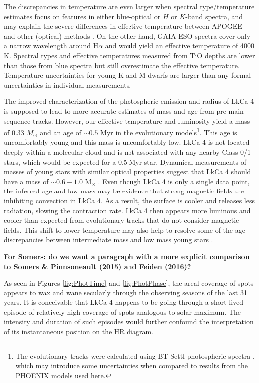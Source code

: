 \documentclass[twocolumn]{emulateapj}%
\begin{document}
The discrepancies in temperature are even larger when spectral type/temperature estimates focus on features in either blue-optical or $H$ or $K$-band spectra, and may explain the severe differences in effective temperature between APOGEE and other (optical) methods \citep{cottaar14}.  On the other hand, GAIA-ESO spectra \citep{frasca15} cover only a narrow wavelength around H$\alpha$ and would yield an effective temperature of 4000 K.   Spectral types and effective temperatures measured from TiO depths \citep{herczeg14} are lower than those from blue spectra but still overestimate the effective temperature.  Temperature uncertainties for young K and M dwarfs are larger than any formal uncertainties in individual measurements.

The improved characterization of the photospheric emission and radius of LkCa 4 is supposed to lead to more accurate estimates of mass and age from pre-main sequence tracks.  However, our effective temperature and luminosity yield a mass of 0.33 $M_\odot$ and an age of $\sim 0.5$ Myr in the \citet{baraffe15} evolutionary models\footnote{The \citet{baraffe15} evolutionary tracks were calculated using BT-Settl photospheric spectra \citep{allard14}, which may introduce some uncertainties when compared to results from the PHOENIX models used here.}.  This age is uncomfortably young and this mass is uncomfortably low.  LkCa 4 is not located deeply within a molecular cloud and is not associated with any nearby Class 0/1 stars, which would be expected for a 0.5 Myr star.  Dynamical measurements of masses of young stars with similar optical properties suggest that LkCa 4 should have a mass of $\sim 0.6-1.0$ M$_\odot$ \citep[e.g.][]{guilloteau14,czekala16,rizzuto16}.  Even though LkCa 4 is only a single data point, the inferred age and low mass may be evidence that strong magnetic fields are inhibiting convection in LkCa 4.  As a result, the surface is cooler and releases less radiation, slowing the contraction rate.  LkCa 4 then appears more luminous and cooler than expected from evolutionary tracks that do not consider magnetic fields.   This shift to lower temperature may also help to resolve some of the age discrepancies between intermediate mass and low mass young stars \citep[e.g.][]{herczeg15}.

{\bf For Somers:  do we want a paragraph with a more explicit comparison to Somers \& Pinnsoneault (2015) and Feiden (2016)?}

As seen in Figures \ref{fig:PhotTime} and \ref{fig:PhotPhase}, the areal coverage of spots appears to wax and wane secularly through the observing seasons of the last 31 years.  It is conceivable that LkCa 4 happens to be going through a short-lived episode of relatively high coverage of spots analogous to solar maximum.  The intensity and duration of such episodes would further confound the interpretation of its instantaneous position on the HR diagram.
\end{document}
